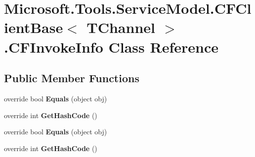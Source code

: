 \hypertarget{class_microsoft_1_1_tools_1_1_service_model_1_1_c_f_client_base_3_01_t_channel_01_4_1_1_c_f_invoke_info}{
\section{Microsoft.Tools.ServiceModel.CFClientBase$<$ TChannel $>$.CFInvokeInfo Class Reference}
\label{class_microsoft_1_1_tools_1_1_service_model_1_1_c_f_client_base_3_01_t_channel_01_4_1_1_c_f_invoke_info}
}
\subsection*{Public Member Functions}
\begin{DoxyCompactItemize}
\item 
\hypertarget{class_microsoft_1_1_tools_1_1_service_model_1_1_c_f_client_base_3_01_t_channel_01_4_1_1_c_f_invoke_info_a58d2142dc6a678edba00f834500dbbe9}{
override bool {\bfseries Equals} (object obj)}
\label{class_microsoft_1_1_tools_1_1_service_model_1_1_c_f_client_base_3_01_t_channel_01_4_1_1_c_f_invoke_info_a58d2142dc6a678edba00f834500dbbe9}

\item 
\hypertarget{class_microsoft_1_1_tools_1_1_service_model_1_1_c_f_client_base_3_01_t_channel_01_4_1_1_c_f_invoke_info_a1496abeae2becddd222053ad574a6bc0}{
override int {\bfseries GetHashCode} ()}
\label{class_microsoft_1_1_tools_1_1_service_model_1_1_c_f_client_base_3_01_t_channel_01_4_1_1_c_f_invoke_info_a1496abeae2becddd222053ad574a6bc0}

\item 
\hypertarget{class_microsoft_1_1_tools_1_1_service_model_1_1_c_f_client_base_3_01_t_channel_01_4_1_1_c_f_invoke_info_a58d2142dc6a678edba00f834500dbbe9}{
override bool {\bfseries Equals} (object obj)}
\label{class_microsoft_1_1_tools_1_1_service_model_1_1_c_f_client_base_3_01_t_channel_01_4_1_1_c_f_invoke_info_a58d2142dc6a678edba00f834500dbbe9}

\item 
\hypertarget{class_microsoft_1_1_tools_1_1_service_model_1_1_c_f_client_base_3_01_t_channel_01_4_1_1_c_f_invoke_info_a1496abeae2becddd222053ad574a6bc0}{
override int {\bfseries GetHashCode} ()}
\label{class_microsoft_1_1_tools_1_1_service_model_1_1_c_f_client_base_3_01_t_channel_01_4_1_1_c_f_invoke_info_a1496abeae2becddd222053ad574a6bc0}

\end{DoxyCompactItemize}
